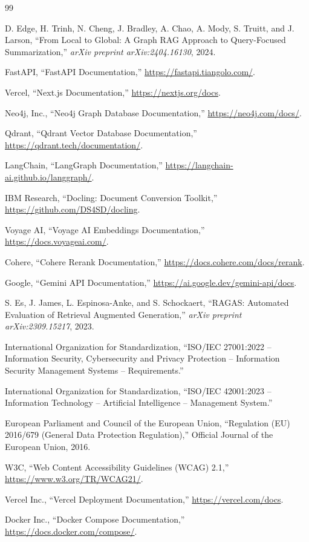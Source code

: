 \documentclass[12pt,a4paper]{report}
\begin{document}
\begin{thebibliography}{99}

D. Edge, H. Trinh, N. Cheng, J. Bradley, A. Chao, A. Mody, S. Truitt, and
J. Larson, ``From Local to Global: A Graph RAG Approach to Query-Focused
Summarization,'' \emph{arXiv preprint arXiv:2404.16130}, 2024.

FastAPI, ``FastAPI Documentation,'' \url{https://fastapi.tiangolo.com/}.

Vercel, ``Next.js Documentation,'' \url{https://nextjs.org/docs}.

Neo4j, Inc., ``Neo4j Graph Database Documentation,'' \url{https://neo4j.com/docs/}.

Qdrant, ``Qdrant Vector Database Documentation,'' \url{https://qdrant.tech/documentation/}.

LangChain, ``LangGraph Documentation,'' \url{https://langchain-ai.github.io/langgraph/}.

IBM Research, ``Docling: Document Conversion Toolkit,'' \url{https://github.com/DS4SD/docling}.

Voyage AI, ``Voyage AI Embeddings Documentation,'' \url{https://docs.voyageai.com/}.

Cohere, ``Cohere Rerank Documentation,'' \url{https://docs.cohere.com/docs/rerank}.

Google, ``Gemini API Documentation,'' \url{https://ai.google.dev/gemini-api/docs}.

S. Es, J. James, L. Espinosa-Anke, and S. Schockaert, ``RAGAS: Automated
Evaluation of Retrieval Augmented Generation,'' \emph{arXiv preprint
arXiv:2309.15217}, 2023.

International Organization for Standardization, ``ISO/IEC 27001:2022 --
Information Security, Cybersecurity and Privacy Protection -- Information
Security Management Systems -- Requirements.''

International Organization for Standardization, ``ISO/IEC 42001:2023 --
Information Technology -- Artificial Intelligence -- Management System.''

European Parliament and Council of the European Union, ``Regulation (EU)
2016/679 (General Data Protection Regulation),'' Official Journal of the
European Union, 2016.

W3C, ``Web Content Accessibility Guidelines (WCAG) 2.1,''
\url{https://www.w3.org/TR/WCAG21/}.

Vercel Inc., ``Vercel Deployment Documentation,'' \url{https://vercel.com/docs}.

Docker Inc., ``Docker Compose Documentation,'' \url{https://docs.docker.com/compose/}.

\end{thebibliography}
\end{document}
